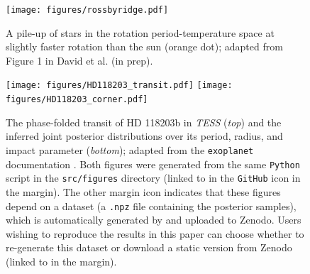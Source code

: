 \documentclass[twocolumn]{aastex631}
\begin{document}
\begin{figure}[ht!]
    \begin{centering}
        \texttt{[image: figures/rossbyridge.pdf]}
        \caption{
            A pile-up of stars in the rotation period-temperature space at slightly faster rotation than the sun (orange dot); adapted from Figure 1 in David et al. (in prep).
        }
        \label{fig:rossbyridge}
    \end{centering}
\end{figure}

\begin{figure}[ht!]
    \begin{centering}
        \texttt{[image: figures/HD118203\_transit.pdf]}
        \texttt{[image: figures/HD118203\_corner.pdf]}
        \caption{
            The phase-folded transit of HD 118203b in \emph{TESS} (\emph{top}) and the inferred joint posterior distributions over its period, radius, and impact parameter (\emph{bottom}); adapted from the \texttt{exoplanet} documentation \citep{ForemanMackey2021}.
            Both figures were generated from the same \texttt{Python} script in the \texttt{src/figures} directory (linked to in the \texttt{GitHub} icon in the margin). The other margin icon indicates that these figures depend on a dataset (a \texttt{.npz} file containing the posterior samples), which is automatically generated by \showyourwork and uploaded to Zenodo. 
            Users wishing to reproduce the results in this paper can choose whether to re-generate this dataset or download a static version from Zenodo (linked to in the margin).
        }
        \label{fig:HD118203}
    \end{centering}
\end{figure}
\end{document}
